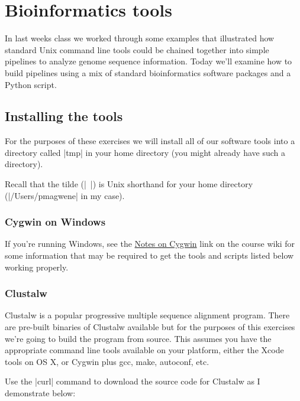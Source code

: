 
 
\section{Bioinformatics tools}

In last weeks class we worked through some examples that illustrated how standard Unix command line tools could be chained together into simple pipelines to analyze genome sequence information. Today we'll examine how to build  pipelines using a mix of standard bioinformatics software packages and a Python script.

\subsection{Installing the tools}

For the purposes of these exercises we will install all of our software tools into a directory called |tmp| in your home directory (you might already have such a directory).
%
%
Recall that the tilde (|~|) is Unix shorthand for your home directory (|/Users/pmagwene| in my case).

\subsubsection{Cygwin on Windows}

If you're running Windows, see the \href{https://github.com/pmagwene/Bio313/wiki/Cygwin-notes}{Notes on Cygwin} link on the course wiki for some information that may be required to get the tools and scripts listed below working properly.


\subsubsection{Clustalw}

Clustalw is a popular progressive multiple sequence alignment program.  There are pre-built binaries of Clustalw available but for the purposes of this exercises we're going to build the program from source. This assumes you have the appropriate command line tools available on your platform, either the Xcode tools on OS X, or Cygwin plus gcc, make, autoconf, etc.

Use the |curl| command to download the source code for Clustalw as I demonstrate below:

